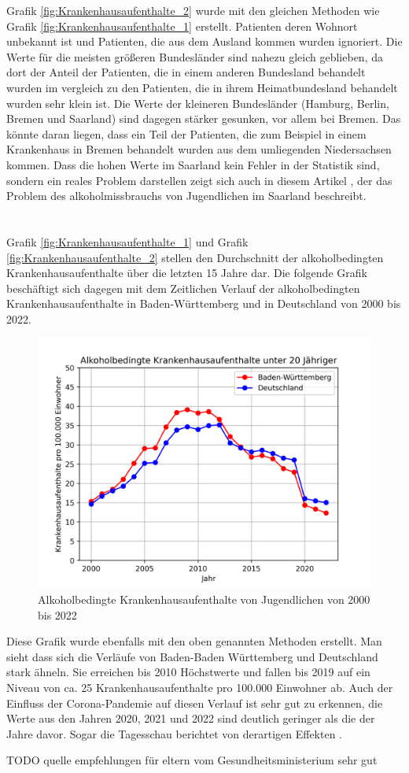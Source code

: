 \documentclass{article}
\begin{document}
Grafik \ref{fig:Krankenhausaufenthalte_2} wurde mit den gleichen Methoden wie Grafik \ref{fig:Krankenhausaufenthalte_1} erstellt. Patienten deren Wohnort unbekannt ist und Patienten, die aus dem Ausland kommen wurden ignoriert. 
Die Werte für die meisten größeren Bundesländer sind nahezu gleich geblieben, da dort der Anteil der Patienten, die in einem anderen Bundesland behandelt wurden im vergleich zu den Patienten, die in ihrem Heimatbundesland behandelt wurden sehr klein ist. Die Werte der kleineren Bundesländer (Hamburg, Berlin, Bremen und Saarland) sind dagegen stärker gesunken, vor allem bei Bremen. Das könnte daran liegen, dass ein Teil der Patienten, die zum Beispiel in einem Krankenhaus in Bremen behandelt wurden aus dem umliegenden Niedersachsen kommen. Dass die hohen Werte im Saarland kein Fehler in der Statistik sind, sondern ein reales Problem darstellen zeigt sich auch in diesem Artikel \autocite{noauthor_saarland_nodate}, der das Problem des alkoholmissbrauchs von Jugendlichen im Saarland beschreibt. 
\\\\\\
Grafik \ref{fig:Krankenhausaufenthalte_1} und Grafik \ref{fig:Krankenhausaufenthalte_2} stellen den Durchschnitt der alkoholbedingten Krankenhausaufenthalte über die letzten 15 Jahre dar. Die folgende Grafik beschäftigt sich dagegen mit dem Zeitlichen Verlauf der alkoholbedingten Krankenhausaufenthalte in Baden-Württemberg und in Deutschland von 2000 bis 2022.
\begin{figure}[H]
    \centering
    \includegraphics[scale=.7]{"assets/Alkohol_BW_Ges.png"}
    \caption{Alkoholbedingte Krankenhausaufenthalte von Jugendlichen von 2000 bis 2022}
    \label{fig:Krankenhausaufenthalte_3}
\end{figure}
Diese Grafik wurde ebenfalls mit den oben genannten Methoden erstellt.
Man sieht dass sich die Verläufe von Baden-Baden Württemberg und Deutschland stark ähneln. Sie erreichen bis 2010 Höchstwerte und fallen bis 2019 auf ein Niveau von ca. 25 Krankenhausaufenthalte pro 100.000 Einwohner ab. Auch der Einfluss der Corona-Pandemie auf diesen Verlauf ist sehr gut zu erkennen, die Werte aus den Jahren 2020, 2021 und 2022 sind deutlich geringer als die der Jahre davor. Sogar die Tagesschau berichtet von derartigen Effekten \autocite{tagesschaude_weniger_nodate}.

TODO quelle empfehlungen für eltern vom Gesundheitsministerium sehr gut
\printbibliography
\end{document}

